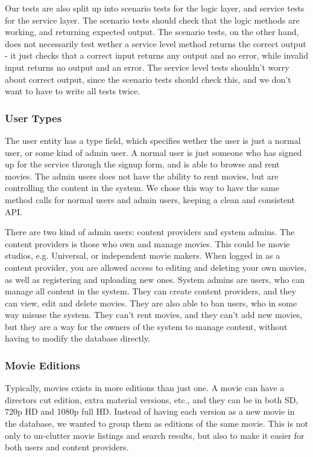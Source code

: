 Our tests are also split up into scenario tests for the logic layer, and service tests for the service layer. The scenario tests should check that the logic methods are working, and returning expected output. The scenario tests, on the other hand, does not necessarily test wether a service level method returns the correct output - it just checks that a correct input returns any output and no error, while invalid input returns no output and an error. The service level tests shouldn't worry about correct output, since the scenario tests should check this, and we don't want to have to write all tests twice.

\subsubsection{User Types}
\label{Design_Service_Analysis_UserTypes}
The user entity has a type field, which specifies wether the user is just a normal user, or some kind of admin user. A normal user is just someone who has signed up for the service through the signup form, and is able to browse and rent movies. The admin users does not have the ability to rent movies, but are controlling the content in the system. We chose this way to have the same method calls for normal users and admin users, keeping a clean and consistent API. 

There are two kind of admin users: content providers and system admins. The content providers is those who own and manage movies. This could be movie studios, e.g. Universal, or independent movie makers. When logged in as a content provider, you are allowed access to editing and deleting your own movies, as well as registering and uploading new ones. System admins are users, who can manage all content in the system. They can create content providers, and they can view, edit and delete movies. They are also able to ban users, who in some way misuse the system. They can't rent movies, and they can't add new movies, but they are a way for the owners of the system to manage content, without having to modify the database directly.

\subsubsection{Movie Editions}
\label{Design_Service_Analysis_MovieEditions}
Typically, movies exists in more editions than just one. A movie can have a directors cut edition, extra material versions, etc., and they can be in both SD, 720p HD and 1080p full HD. Instead of having each version as a new movie in the database, we wanted to group them as editions of the same movie. This is not only to un-clutter movie listings and search results, but also to make it easier for both users and content providers.


